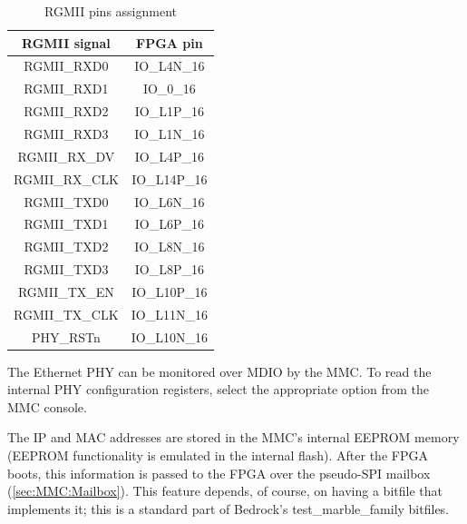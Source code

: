 \documentclass[12pt,oneside,a4]{article}
\begin{document}
\begin{table}[htbp]
\centering
\begin{tabular}{@{}cc@{}}
\toprule
\textbf{RGMII signal}              & \textbf{FPGA pin}                \\ \midrule
RGMII\_RXD0                        & IO\_L4N\_16                      \\
RGMII\_RXD1                        & IO\_0\_16                        \\
RGMII\_RXD2                        & IO\_L1P\_16                      \\
RGMII\_RXD3                        & IO\_L1N\_16                      \\
RGMII\_RX\_DV                      & IO\_L4P\_16                      \\
RGMII\_RX\_CLK                     & IO\_L14P\_16                     \\
RGMII\_TXD0                        & IO\_L6N\_16                      \\
RGMII\_TXD1                        & IO\_L6P\_16                      \\
RGMII\_TXD2                        & IO\_L8N\_16                      \\
RGMII\_TXD3                        & IO\_L8P\_16                      \\
RGMII\_TX\_EN                      & IO\_L10P\_16                     \\
\multicolumn{1}{l}{RGMII\_TX\_CLK} & \multicolumn{1}{l}{IO\_L11N\_16} \\
PHY\_RSTn                          & IO\_L10N\_16                     \\ \bottomrule
\end{tabular}
\caption{RGMII pins assignment}
\label{tab:rgmii}
\end{table}

The Ethernet PHY can be monitored over MDIO by the MMC. To read the internal PHY configuration registers, select the appropriate option from the MMC console.

The IP and MAC addresses are stored in the MMC's internal EEPROM memory (EEPROM functionality is emulated in the internal flash).
After the FPGA boots, this information is passed to the FPGA over the pseudo-SPI mailbox (\ref{sec:MMC:Mailbox}).
This feature depends, of course, on having a bitfile that implements it; this is a standard part of Bedrock's test\_marble\_family bitfiles.
\end{document}
